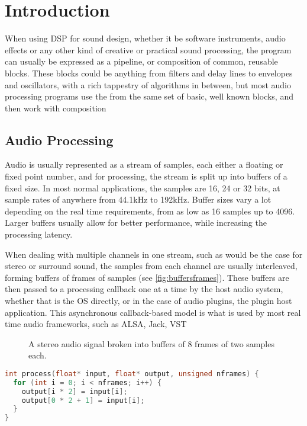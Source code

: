 \chapter{Introduction}

When using DSP for sound design, whether it be software instruments, audio effects or any other kind of creative or practical sound processing, the program can usually be expressed as a pipeline, or composition of common, reusable blocks. These blocks could be anything from filters and delay lines to envelopes and oscillators, with a rich tappestry of algorithms in between, but most audio processing programs use the from the same set of basic, well known blocks, and then work with composition 

\section{Audio Processing}

Audio is usually represented as a stream of samples, each either a floating or fixed point number, and for processing, the stream is split up into buffers of a fixed size. In most normal applications, the samples are 16, 24 or 32 bits, at sample rates of anywhere from 44.1kHz to 192kHz. Buffer sizes vary a lot depending on the real time requirements, from as low as 16 samples up to 4096. Larger buffers usually allow for better performance, while increasing the processing latency.

When dealing with multiple channels in one stream, such as would be the case for stereo or surround sound, the samples from each channel are usually interleaved, forming buffers of frames of samples (see \autoref{fig:buffersframes}). These buffers are then passed to a processing callback one at a time by the host audio system, whether that is the OS directly, or in the case of audio plugins, the plugin host application. This asynchronous callback-based model is what is used by most real time audio frameworks, such as ALSA, Jack, VST 

\begin{figure}
    
    \caption{A stereo audio signal broken into buffers of 8 frames of two samples each.}
    \label{fig:buffersframes}
\end{figure}

\begin{lstlisting}[language=c++,label=lst:jackmerge,float,caption={
    An example process function that sends one input channel to two output channels. Numbers of channels are determined before registering the process function.
}]
int process(float* input, float* output, unsigned nframes) {
  for (int i = 0; i < nframes; i++) {
    output[i * 2] = input[i];
    output[0 * 2 + 1] = input[i];
  }
}
\end{lstlisting}


